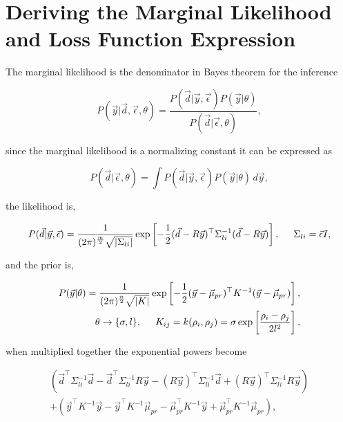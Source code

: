 \chapter{Deriving the Marginal Likelihood and Loss Function Expression}
\label{append:dervml}

The marginal likelihood is the denominator in Bayes theorem for the inference

\begin{equation}
P(\vec{y}|\vec{d}, \vec\epsilon, \theta) = \frac{P(\vec{d}|\vec{y},\vec\epsilon)P(\vec{y}|\theta)}{P(\vec d|\vec\epsilon,\theta)},
\end{equation}

\noindent since the marginal likelihood is a normalizing constant it can be expressed as

\begin{equation}
P(\vec d|\vec\epsilon,\theta) = \int P(\vec{d}|\vec{y},\vec\epsilon)P(\vec{y}|\theta)  \, d\vec y,
\end{equation}

\noindent the likelihood is,

\begin{equation}
P(\vec{d}|\vec{y},\vec\epsilon) = \frac{1}{(2\pi)^{\frac{m}{2}} \sqrt{|\Sigma_{li}|}} \exp \left[ -\frac{1}{2} (\vec d - R\vec y)^{\top} \Sigma^{-1}_{li} (\vec d - R\vec y) \right], \hspace{0.5cm} \Sigma_{li} = \vec \epsilon I,
\end{equation}

\noindent and the prior is,

\begin{equation}
\begin{split}
P(\vec y|\theta) = \frac{1}{(2\pi)^{\frac{n}{2}} \sqrt{|K|}} \exp \left[ -\frac{1}{2} (\vec y - \vec \mu_{pr})^{\top} K^{-1} (\vec y - \vec \mu_{pr}) \right],\\
\theta \rightarrow \{\sigma, l\}, \hspace{0.5cm} K_{ij} = k(\rho_i, \rho_j) = \sigma \exp \left[\frac{\rho_i - \rho_j}{2l^2}\right],
\end{split}
\end{equation}

\noindent when multiplied together the exponential powers become 

\begin{multline*}
\left(\vec d ^\top \Sigma_{li}^{-1} \vec d - \vec d^\top \Sigma_{li}^{-1} R\vec y - (R\vec y)^\top \Sigma_{li}^{-1} \vec d + (R\vec y)^\top \Sigma_{li}^{-1} R\vec y \right)\\ 
+ \left( \vec y^\top K^{-1} \vec y - \vec y^\top K^{-1} \vec \mu_{pr} - \vec \mu_{pr}^\top K^{-1} \vec y + \vec \mu_{pr}^\top K^{-1} \vec \mu_{pr} \right),
\end{multline*}

